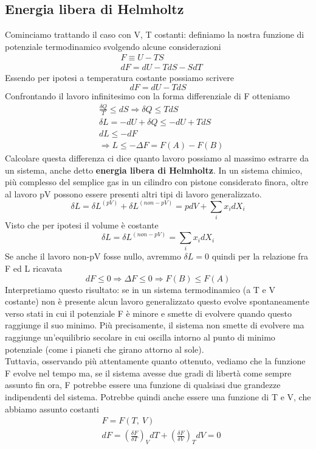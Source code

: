 \documentclass[10pt,a4paper]{article}
\begin{document}
\subsection{Energia libera di Helmholtz}
Cominciamo trattando il caso con V, T costanti: definiamo la nostra funzione di potenziale termodinamico svolgendo alcune considerazioni
\begin{align*}
	&F \equiv U - TS\\
	&dF = dU - TdS-SdT
\end{align*}
Essendo per ipotesi a temperatura costante possiamo scrivere
\[dF = dU - TdS\]
Confrontando il lavoro infinitesimo con la forma differenziale di F otteniamo
\begin{align*}
	&\frac{\delta Q}{T} \leq dS \Rightarrow \delta Q \leq TdS\\
	&\delta L = -dU +\delta Q \leq -dU + TdS\\
	&dL \leq - dF \\
	&\Rightarrow L \leq -\Delta F =  F(A) - F(B)
\end{align*}
Calcolare questa differenza ci dice quanto lavoro possiamo al massimo estrarre da un sistema, anche detto \textbf{energia libera di Helmholtz}. In un sistema chimico, più complesso del semplice gas in un cilindro con pistone considerato finora, oltre al lavoro pV possono essere presenti altri tipi di lavoro generalizzato. 
\[\delta L = \delta L^{(pV)}+\delta L^{(non-pV)} = pdV + \sum_i x_idX_i\]
Visto che per ipotesi il volume è costante
\[\delta L =\delta L^{(non-pV)} = \sum_i x_idX_i\]
Se anche il lavoro non-pV fosse nullo, avremmo \(\delta L = 0 \) quindi per la relazione fra F ed L ricavata
\[dF \leq 0 \Rightarrow \Delta F \leq 0 \Rightarrow F(B)\leq F(A)\]
Interpretiamo questo risultato: se in un sistema termodinamico (a T e V costante) non è presente alcun lavoro generalizzato questo evolve spontaneamente verso stati in cui il potenziale F è minore e smette di evolvere quando questo raggiunge il suo minimo. Più precisamente, il sistema non smette di evolvere ma raggiunge un'equilibrio secolare in cui oscilla intorno al punto di minimo potenziale (come i pianeti che girano attorno al sole).\\
Tuttavia, osservando più attentamente quanto ottenuto, vediamo che la funzione F evolve nel tempo ma, se il sistema avesse due gradi di libertà come sempre assunto fin ora, F potrebbe essere una funzione di qualsiasi due grandezze indipendenti del sistema. Potrebbe quindi anche essere una funzione di T e V, che abbiamo assunto costanti
\begin{align*}
	&F = F(T,\ V)\\
	&dF = \left(\frac{\delta F}{\delta T}\right)_V dT + \left(\frac{\delta F}{\delta V}\right)_T dV = 0
\end{align*}
\end{document}
